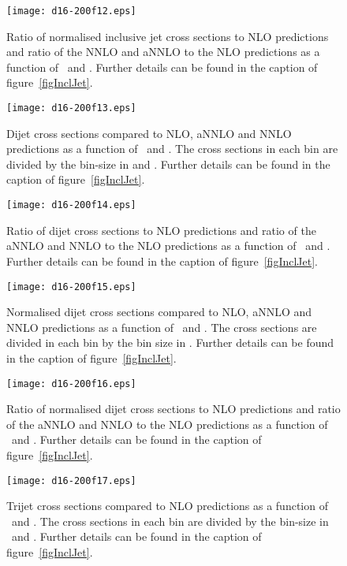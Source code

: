 \documentclass[12pt]{article}
\begin{document}
\begin{figure}[htbp]
  \centering
  \texttt{[image: d16-200f12.eps]}
  \caption{
    Ratio of normalised inclusive jet cross sections to NLO predictions and ratio of the NNLO and aNNLO to the NLO predictions as a function of \Qsq\ and \ptjet.
    Further details can be found in the caption of figure~\ref{figInclJet}.
  }
  \label{figNormInclJetRatio}
\end{figure}


\newpage
\begin{figure}
  \centering
  \texttt{[image: d16-200f13.eps]}
  \caption{
    Dijet cross sections compared to NLO, aNNLO and  NNLO predictions as a function of \Qsq\ and \meanptdi.
    The cross sections in each bin are divided by the bin-size in
    \meanptdi{} and \Qsq{}.
    Further details can be found in the caption of figure~\ref{figInclJet}.
  }
  \label{figDijet}
\end{figure}

\begin{figure}
  \centering
  \texttt{[image: d16-200f14.eps]}
  \caption{
    Ratio of dijet cross sections to NLO predictions and ratio of the aNNLO and NNLO to the NLO predictions as a function of \Qsq\ and \meanptdi.
    Further details can be found in the caption of figure~\ref{figInclJet}.
  }
  \label{figDijetRatio}
\end{figure}

\begin{figure}
  \centering
  \texttt{[image: d16-200f15.eps]}
  \caption{
    Normalised dijet cross sections compared to NLO, aNNLO and NNLO predictions as a function of \Qsq\ and \meanptdi.
    The cross sections are divided in each bin by the bin size in \meanptdi.
    Further details can be found in the caption of figure~\ref{figInclJet}.
  }
  \label{figNormDijet}
\end{figure}

\begin{figure}
  \centering
  \texttt{[image: d16-200f16.eps]}
  \caption{
    Ratio of normalised dijet cross sections to NLO predictions and ratio of the aNNLO 
    and NNLO to the NLO predictions as a function of \Qsq\ and \meanptdi.
    Further details can be found in the caption of figure~\ref{figInclJet}.
  }
  \label{figNormDijetRatio}
\end{figure}

\newpage
\begin{figure}
  \centering
  \texttt{[image: d16-200f17.eps]}
  \caption{
    Trijet cross sections compared to NLO predictions as a function of \Qsq\ and \meanpttri.
    The cross sections in each bin are divided by the bin-size in \meanpttri\ and \Qsq{}.
    Further details can be found in the caption of figure~\ref{figInclJet}.
  }
  \label{figTrijet}
\end{figure}
\end{document}

